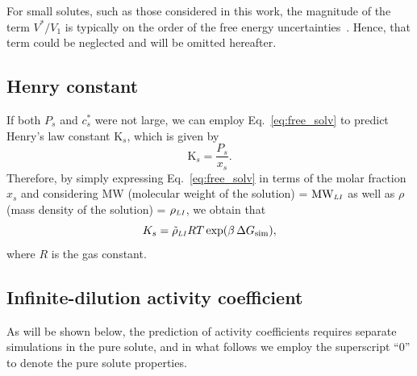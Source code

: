 \documentclass[3p,twocolumn]{elsarticle}
\begin{document}
For small solutes, such as those considered in this work, the magnitude of the term $V^{\ast}/V_1$ is typically on the order of the free energy uncertainties~\cite{Shirts_2003}. Hence, that term could be neglected and will be omitted hereafter.

\subsection*{Henry constant}
If both $P_s$ and $c_s^{\ast}$ were not large, we can employ Eq.~\ref{eq:free_solv} to predict Henry's law constant $\text{K}_s$, which is given by~\cite{Prausnitz}
\begin{equation}
\text{K}_s =\frac{P_s}{x_s}.
\end{equation}
Therefore, by simply expressing Eq.~\ref{eq:free_solv} in terms of the molar fraction $x_s$ and considering MW (molecular weight of the solution) = $\text{MW}_{\scaleto{LI}{4pt}}$ as well as $\rho$ (mass density of the solution) = $\rho_{\scaleto{LI}{4pt}}$, we obtain that
\begin{equation}
\label{eq:henry_eq}
K_s = \tilde{\rho}_{\scaleto{LI}{4pt}} R T \exp(\beta \, \Delta G_{\text{sim}}),
\end{equation}
where $R$ is the gas constant.

\subsection*{Infinite-dilution activity coefficient}

As will be shown below, the prediction of activity coefficients requires separate simulations in the pure solute, and in what follows we employ the superscript ``$0$'' to denote the pure solute properties.
\end{document}
